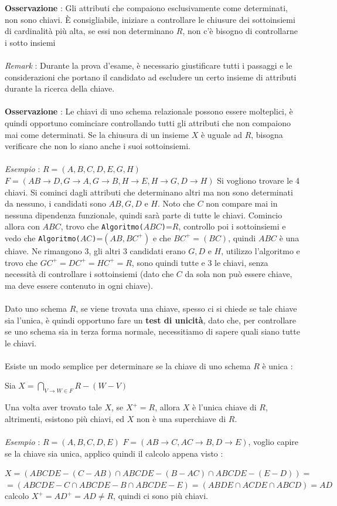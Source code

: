 \documentclass[12pt, letterpaper]{article}
\newcommand{\codee}[1]{\colorbox{white}{\texttt{#1}}}
\newcommand{\acc}{\\\hphantom{}\\}
\newcommand{\dete}{{\rightarrow}}
\begin{document}
\textbf{Osservazione} : Gli attributi che compaiono esclusivamente come determinati, non sono chiavi. È consigliabile, iniziare a controllare 
le chiusure dei sottoinsiemi di cardinalità più alta, se essi non determinano \(R\), non c'è bisogno di controllarne i 
sotto insiemi
\acc\textit{Remark }: Durante la prova d'esame, è necessario giustificare tutti i passaggi e le considerazioni che portano il candidato 
ad escludere un certo insieme di attributi durante la ricerca della chiave.\acc 
\textbf{Osservazione} : Le chiavi di uno schema relazionale possono essere molteplici, è quindi opportuno cominciare 
controllando tutti gli attributi che non compaiono mai come determinati. Se la chiusura di un insieme \(X\) è uguale ad 
\(R\), bisogna verificare che non lo siano anche i suoi sottoinsiemi.\acc
\textit{Esempio} : \(R=(A,B,C,D,E,G,H)\)\hphantom{  } \(F=(AB\dete D,G\dete A,G\dete B,H\dete E,H\dete G,D\dete H)\) 
Si vogliono trovare le 4 chiavi. Si cominci dagli attributi che determinano altri ma non sono determinati da nessuno, i 
candidati sono \(AB,G,D\) e \(H\). Noto che \(C\) non compare mai in nessuna dipendenza funzionale, quindi sarà 
parte di tutte le chiavi. Comincio allora con \(ABC\), trovo che \codee{Algoritmo(}\(ABC\)\codee{)}=\(R\), controllo poi 
i sottoinsiemi e vedo che \codee{Algoritmo(}\(AC\)\codee{)}=\((AB, BC^+)\) e che \(BC^+=(BC)\), quindi \(ABC\) è una chiave. 
Ne rimangono 3, gli altri 3 candidati erano \(G,D\) e \(H\), utilizzo l'algoritmo e trovo che \(GC^+=DC^+=HC^+=R\), sono quindi 
tutte e 3 le chiavi, senza necessità di controllare i sottoinsiemi (dato che \(C\) da sola non può essere chiave, ma deve 
essere contenuto in ogni chiave).\acc 
Dato uno schema \(R\), se viene trovata una chiave, spesso ci si chiede se tale chiave sia l'unica, è quindi opportuno 
fare un \textbf{test di unicità}, dato che, per controllare se uno schema sia in terza forma normale, necessitiamo di sapere quali 
siano tutte le chiavi. \acc 
Esiste un modo semplice per determinare se la chiave di uno schema \(R\) è unica :\begin{center}
    Sia \(X=\displaystyle\bigcap_{V\rightarrow W\in F}R-(W-V)\)
\end{center}
Una volta aver trovato tale \(X\), se \(X^+=R\), allora \(X\) è l'unica chiave di \(R\), altrimenti, esistono più chiavi, 
ed \(X\) non è una superchiave di \(R\).\acc 
\textit{Esempio} : \(R=(A,B,C,D,E)\)\hphantom{  } \(F=(AB\dete C,AC\dete B,D\dete E)\), voglio capire se la chiave sia unica, 
applico quindi il calcolo appena visto :\begin{center}
    
    \(X=(ABCDE-(C-AB)\cap ABCDE-(B-AC)\cap ABCDE-(E-D))=\)\\
    \(=(ABCDE-C\cap ABCDE-B\cap ABCDE-E)=(ABDE\cap ACDE\cap ABCD)=AD\)\\
    calcolo \(X^+=AD^+=AD\ne R\), quindi ci sono più chiavi.
\end{center}
\end{document}

